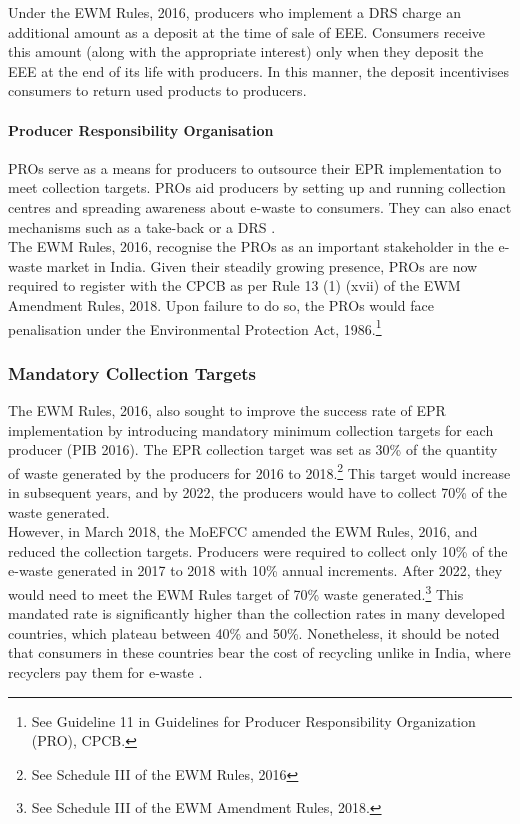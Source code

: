 \documentclass[a4paper, 12pt]{article}
\begin{document}
                    Under the EWM Rules, 2016, producers who implement a DRS charge an additional amount as a deposit at the time of sale of EEE. Consumers receive this amount (along with the appropriate interest) only when they deposit the EEE at the end of its life with producers. In this manner, the deposit incentivises consumers to return used products to producers. 
                    
\paragraph{Producer Responsibility Organisation}
                    
                    PROs serve as a means for producers to outsource their EPR implementation to meet collection targets. PROs aid producers by setting up and running collection centres and spreading awareness about e-waste to consumers. They can also enact mechanisms such as a take-back or a DRS \parencite{cpcbproreport}. \\
                    
                    The EWM Rules, 2016, recognise the PROs as an important stakeholder in the e-waste market in India. Given their steadily growing presence, PROs are now required to register with the CPCB as per Rule 13 (1) (xvii) of the EWM Amendment Rules, 2018. Upon failure to do so, the PROs would face penalisation under the Environmental Protection Act, 1986.\footnote{See Guideline 11 in Guidelines for Producer Responsibility Organization (PRO), CPCB.} 
                    
\subsubsection{Mandatory Collection Targets}
                    
                    The EWM Rules, 2016, also sought to improve the success rate of EPR implementation by introducing mandatory minimum collection targets for each producer (PIB 2016). The EPR collection target was set as 30\% of the quantity of waste generated by the producers for 2016 to 2018.\footnote{See Schedule III of the EWM Rules, 2016} This target would increase in subsequent years, and by 2022, the producers would have to collect 70\% of the waste generated. \\
                    
                    However, in March 2018, the MoEFCC amended the EWM Rules, 2016, and reduced the collection targets. Producers were required to collect only 10\% of the e-waste generated in 2017 to 2018 with 10\% annual increments. After 2022, they would need to meet the EWM Rules target of 70\% waste generated.\footnote{See Schedule III of the EWM Amendment Rules, 2018.} This mandated rate is significantly higher than the collection rates in many developed countries, which plateau between 40\% and 50\%. Nonetheless, it should be noted that consumers in these countries bear the cost of recycling unlike in India, where recyclers pay them for e-waste \parencite{veitreport}. \\
                    
\end{document}
